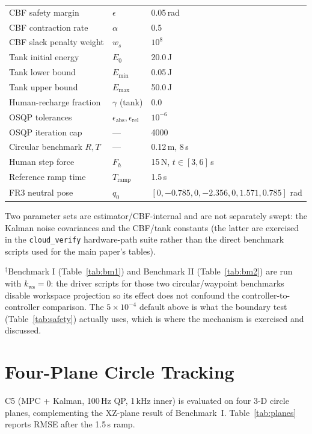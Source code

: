 \documentclass[journal]{IEEEtran}
\begin{document}
\begin{table}[!t]
\begin{tabular}{p{3.1cm}p{0.9cm}p{2.0cm}}
CBF safety margin & $\epsilon$ & 0.05\,rad\\
CBF contraction rate & $\alpha$ & 0.5\\
CBF slack penalty weight & $w_s$ & $10^{8}$\\
Tank initial energy & $E_0$ & 20.0\,J\\
Tank lower bound & $E_\text{min}$ & 0.05\,J\\
Tank upper bound & $E_\text{max}$ & 50.0\,J\\
Human-recharge fraction & $\gamma$ (tank) & 0.0\\
OSQP tolerances & $\epsilon_\text{abs},\epsilon_\text{rel}$ & $10^{-6}$\\
OSQP iteration cap & --- & 4000\\
Circular benchmark $R,T$ & --- & 0.12\,m, 8\,s\\
Human step force & $F_h$ & 15\,N, $t\in[3,6]$\,s\\
Reference ramp time & $T_\text{ramp}$ & 1.5\,s\\
FR3 neutral pose & $q_0$ & $[0,-0.785,0,-2.356,0,1.571,0.785]$ rad\\
\bottomrule
\end{tabular}
\end{table}

Two parameter sets are estimator/CBF-internal and are not separately
swept: the Kalman noise covariances and the CBF/tank constants (the
latter are exercised in the \texttt{cloud\_verify} hardware-path suite
rather than the direct benchmark scripts used for the main paper's
tables).

$^\dagger$Benchmark I (Table~\ref{tab:bm1}) and Benchmark II
(Table~\ref{tab:bm2}) are run with $k_\text{ws}=0$: the driver scripts
for those two circular/waypoint benchmarks disable workspace projection
so its effect does not confound the controller-to-controller
comparison. The $5\times10^{-4}$ default above is what the boundary
test (Table~\ref{tab:safety}) actually uses, which is where the
mechanism is exercised and discussed.

\section{Four-Plane Circle Tracking}\label{sec:planes}

C5 (MPC + Kalman, 100\,Hz QP, 1\,kHz inner) is evaluated on four 3-D
circle planes, complementing the XZ-plane result of Benchmark~I.
Table~\ref{tab:planes} reports RMSE after the 1.5\,s ramp.
\end{document}
